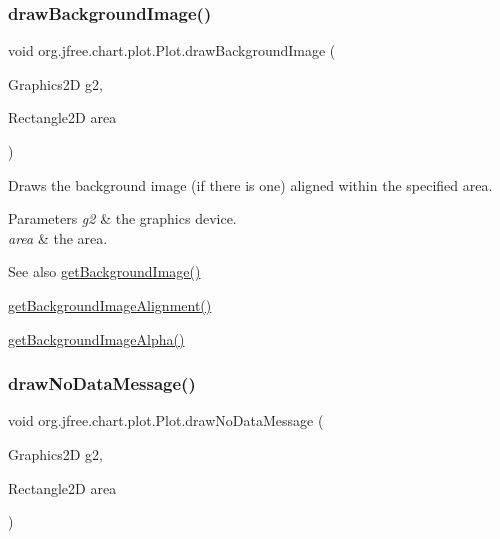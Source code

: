 \subsubsection{\texorpdfstring{draw\+Background\+Image()}{drawBackgroundImage()}}
{\footnotesize\ttfamily void org.\+jfree.\+chart.\+plot.\+Plot.\+draw\+Background\+Image (\begin{DoxyParamCaption}\item[{Graphics2D}]{g2,  }\item[{Rectangle2D}]{area }\end{DoxyParamCaption})}

Draws the background image (if there is one) aligned within the specified area.


\begin{DoxyParams}{Parameters}
{\em g2} & the graphics device. \\
\hline
{\em area} & the area.\\
\hline
\end{DoxyParams}
\begin{DoxySeeAlso}{See also}
\mbox{\hyperlink{classorg_1_1jfree_1_1chart_1_1plot_1_1_plot_a22e81fa28885106c5cdc5d6411305c76}{get\+Background\+Image()}} 

\mbox{\hyperlink{classorg_1_1jfree_1_1chart_1_1plot_1_1_plot_ae0d72cd3dcbd9d4aad47d98d00a976ce}{get\+Background\+Image\+Alignment()}} 

\mbox{\hyperlink{classorg_1_1jfree_1_1chart_1_1plot_1_1_plot_a20cf4bf1ab215cef716eac03f336879c}{get\+Background\+Image\+Alpha()}} 
\end{DoxySeeAlso}
\mbox{\label{classorg_1_1jfree_1_1chart_1_1plot_1_1_plot_ab47a7a1d4dfe2e9b0c222157b8522196}} 
\subsubsection{\texorpdfstring{draw\+No\+Data\+Message()}{drawNoDataMessage()}}
{\footnotesize\ttfamily void org.\+jfree.\+chart.\+plot.\+Plot.\+draw\+No\+Data\+Message (\begin{DoxyParamCaption}\item[{Graphics2D}]{g2,  }\item[{Rectangle2D}]{area }\end{DoxyParamCaption})\hspace{0.3cm}{\ttfamily [protected]}}


